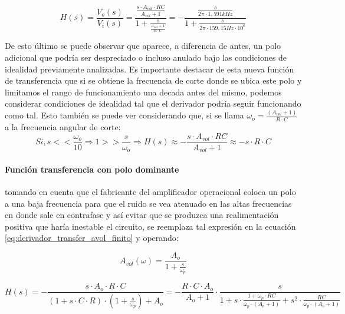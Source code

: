\begin{equation}
	H(s) = \frac{V_o(s)}{V_i(s)} = \frac{\frac{s \cdot A_{vol} \cdot RC}{A_{vol} + 1}}{1 + \frac{s}{\frac{A_{vol} + 1}{R \cdot C}}}
	= - \frac{\frac{s}{2 \pi \cdot 1,591kHz}}{1 + \frac{s}{2 \pi \cdot 159,15Hz \cdot 10^{6}}}
	\label{eq:derivador_transfer_avol_finito}
\end{equation}

De esto \'ultimo se puede observar que aparece, a diferencia de antes, un polo adicional que podr\'ia ser despreciado o incluso anulado bajo las condiciones de idealidad previamente analizadas. Es importante destacar de esta nueva funci\'on de transferencia que si se obtiene la frecuencia de corte donde se ubica este polo y limitamos el rango de funcionamiento una decada antes del mismo, podemos considerar condiciones de idealidad tal que el derivador podr\'ia seguir funcionando como tal. Esto tambi\'en se puede ver considerando que, si se llama $\omega_o = \frac{(A_{vol} + 1)}{R \cdot C}$ a la frecuencia angular de corte:
\begin{equation*}
	Si, s << \frac{\omega_o}{10} \Rightarrow 1 >> \frac{s}{\omega_o} \Rightarrow 
	H(s) \approx - \frac{s \cdot A_{vol} \cdot RC}{A_{vol} + 1} \approx
	- s \cdot R \cdot C
\end{equation*}


\paragraph*{Funci\'on transferencia con polo dominante}tomando en cuenta que el fabricante del amplificador operacional coloca un polo a una baja frecuencia para que el ruido se vea atenuado en las altas frecuencias en donde sale en contrafase y as\'i evitar que se produzca una realimentaci\'on positiva que har\'ia inestable el circuito, se reemplaza tal expresi\'on en la ecuaci\'on \ref{eq:derivador_transfer_avol_finito} y operando:

\begin{equation}
	A_{vol}(\omega) = \frac{A_o}{1 + \frac{s}{\omega_p}}
	\label{eq:polo_dominante}
\end{equation}

\begin{equation}
	H(s) = - \frac{s \cdot A_{o} \cdot R \cdot C}{(1 + s \cdot C \cdot R) \cdot (1 + \frac{s}{\omega_p}) + A_{o}} = - \frac{R \cdot C \cdot A_{o}}{A_{o} + 1} \cdot \frac{s}{1 + s \cdot \frac{1 + \omega_p \cdot RC}{\omega_p \cdot(A_o + 1)} + s^{2} \cdot \frac{RC}{\omega_p \cdot (A_o + 1)}}
\end{equation}

